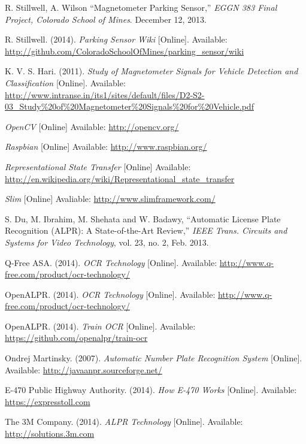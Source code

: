 \documentclass[11pt, oneside, fullpage, doublespace]{article}
\begin{document}
\begin{thebibliography}{99}
 R. Stillwell, A. Wilson ``Magnetometer Parking Sensor,'' \emph{EGGN 383 Final Project, Colorado School of Mines}. December 12, 2013.

 R. Stillwell. (2014). \emph{Parking Sensor Wiki} [Online]. Available: \url{http://github.com/ColoradoSchoolOfMines/parking_sensor/wiki}

 K. V. S. Hari. (2011). \emph{Study of Magnetometer Signals for Vehicle Detection and Classification} [Online]. Available: \url{http://www.intranse.in/its1/sites/default/files/D2-S2-03_Study\%20of\%20Magnetometer\%20Signals\%20for\%20Vehicle.pdf}

 \emph{OpenCV} [Online] Available: \url{http://opencv.org/}

 \emph{Raspbian} [Online] Available: \url{http://www.raspbian.org/}

 \emph{Representational State Transfer} [Online] Available: \url{http://en.wikipedia.org/wiki/Representational_state_transfer}

 \emph{Slim} [Online] Avaliable: \url{http://www.slimframework.com/}

 S. Du, M. Ibrahim, M. Shehata and W. Badawy, ``Automatic License Plate Recognition (ALPR): A State-of-the-Art Review,'' \emph{IEEE Trans. Circuits and Systems for Video Technology}, vol. 23, no. 2, Feb. 2013.

 Q-Free ASA. (2014). \emph{OCR Technology} [Online]. Available: \url{http://www.q-free.com/product/ocr-technology/}

 OpenALPR. (2014). \emph{OCR Technology} [Online]. Available: \url{http://www.q-free.com/product/ocr-technology/}

 OpenALPR. (2014). \emph{Train OCR} [Online]. Available: \url{https://github.com/openalpr/train-ocr}

 Ondrej Martinsky. (2007). \emph{Automatic Number Plate Recognition System} [Online]. Available: \url{http://javaanpr.sourceforge.net/}

 E-470 Public Highway Authority. (2014). \emph{How E-470 Works} [Online]. Available: \url{https://expresstoll.com}

 The 3M Company. (2014). \emph{ALPR Technology} [Online]. Available: \url{http://solutions.3m.com}


\end{thebibliography}
\end{document}
